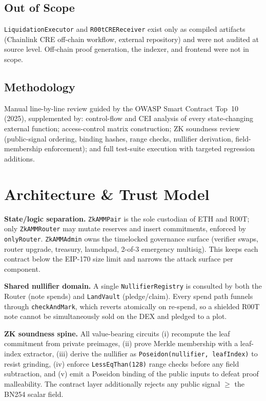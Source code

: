 \documentclass[11pt,a4paper]{article}
\begin{document}
\subsection{Out of Scope}
\texttt{LiquidationExecutor} and \texttt{R00tCREReceiver} exist only as compiled
artifacts (Chainlink CRE off-chain workflow, external repository) and were not
audited at source level. Off-chain proof generation, the indexer, and frontend
were not in scope.

\subsection{Methodology}
Manual line-by-line review guided by the OWASP Smart Contract Top~10 (2025),
supplemented by: control-flow and CEI analysis of every state-changing external
function; access-control matrix construction; ZK soundness review (public-signal
ordering, binding hashes, range checks, nullifier derivation, field-membership
enforcement); and full test-suite execution with targeted regression additions.

\section{Architecture \& Trust Model}

\textbf{State/logic separation.} \texttt{ZkAMMPair} is the sole custodian of ETH
and R00T; only \texttt{ZkAMMRouter} may mutate reserves and insert commitments,
enforced by \texttt{onlyRouter}. \texttt{ZkAMMAdmin} owns the timelocked governance
surface (verifier swaps, router upgrade, treasury, launchpad, 2-of-3 emergency
multisig). This keeps each contract below the EIP-170 size limit and narrows the
attack surface per component.

\textbf{Shared nullifier domain.} A single \texttt{NullifierRegistry} is consulted
by both the Router (note spends) and \texttt{LandVault} (pledge/claim). Every spend
path funnels through \texttt{checkAndMark}, which reverts atomically on re-spend, so
a shielded R00T note cannot be simultaneously sold on the DEX and pledged to a plot.

\textbf{ZK soundness spine.} All value-bearing circuits (i) recompute the leaf
commitment from private preimages, (ii) prove Merkle membership with a leaf-index
extractor, (iii) derive the nullifier as \texttt{Poseidon(nullifier, leafIndex)}
to resist grinding, (iv) enforce \texttt{LessEqThan(128)} range checks before any
field subtraction, and (v) emit a Poseidon binding of the public inputs to defeat
proof malleability. The contract layer additionally rejects any public signal
$\geq$ the BN254 scalar field.
\end{document}
